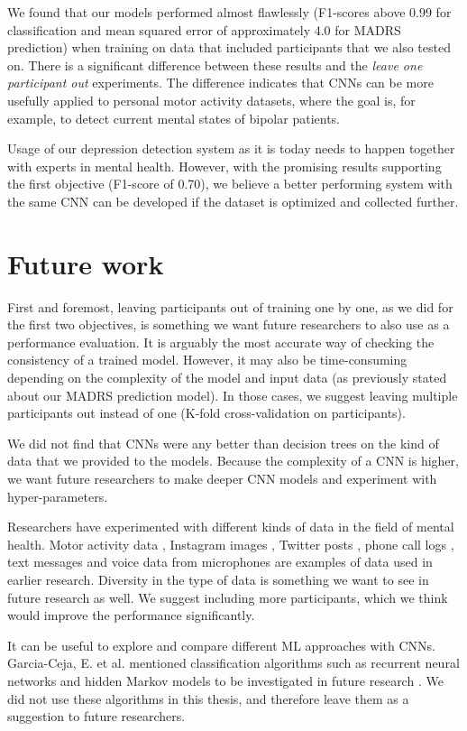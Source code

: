 We found that our models performed almost flawlessly (F1-scores above 0.99 for classification and mean squared error of approximately 4.0 for MADRS prediction) when training on data that included participants that we also tested on. There is a significant difference between these results and the \textit{leave one participant out} experiments. The difference indicates that CNNs can be more usefully applied to personal motor activity datasets, where the goal is, for example, to detect current mental states of bipolar patients. 

Usage of our depression detection system as it is today needs to happen together with experts in mental health. However, with the promising results supporting the first objective (F1-score of 0.70), we believe a better performing system with the same CNN can be developed if the dataset is optimized and collected further. 

\section{Future work}
First and foremost, leaving participants out of training one by one, as we did for the first two objectives, is something we want future researchers to also use as a performance evaluation. It is arguably the most accurate way of checking the consistency of a trained model. However, it may also be time-consuming depending on the complexity of the model and input data (as previously stated about our MADRS prediction model). In those cases, we suggest leaving multiple participants out instead of one (K-fold cross-validation on participants).

We did not find that CNNs were any better than decision trees on the kind of data that we provided to the models. Because the complexity of a CNN is higher, we want future researchers to make deeper CNN models and experiment with hyper-parameters. 

Researchers have experimented with different kinds of data in the field of mental health. Motor activity data \cite{obrien_depression, GarciaCeja2018_classification_bipolar}, Instagram images \cite{instagram_depression}, Twitter posts \cite{twitter_depression}, phone call logs \cite{faurholt_smartphone_bipolar, grunerbl_smartphone_bipolar}, text messages and voice data from microphones \cite{grunerbl_smartphone_bipolar} are examples of data used in earlier research. Diversity in the type of data is something we want to see in future research as well. We suggest including more participants, which we think would improve the performance significantly.

It can be useful to explore and compare different ML approaches with CNNs. Garcia-Ceja, E. et al. mentioned classification algorithms such as recurrent neural networks and hidden Markov models to be investigated in future research \cite{GarciaCeja2018_classification_bipolar}. We did not use these algorithms in this thesis, and therefore leave them as a suggestion to future researchers. 